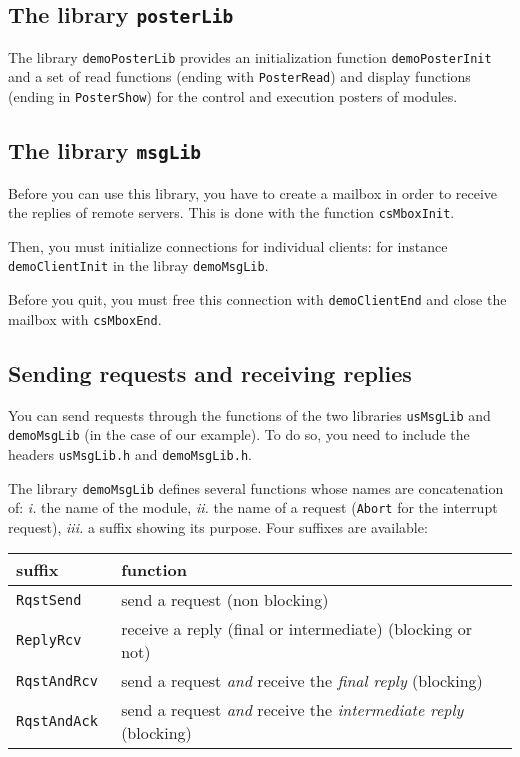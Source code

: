 \subsection{The library \texttt{posterLib}}

The library \texttt{demoPosterLib} provides an initialization function 
\texttt{demoPosterInit} and a set of  read functions (ending with \texttt{PosterRead})
and display  functions (ending in \texttt{PosterShow}) for the  control and
execution posters of modules.

\subsection{The library \texttt{msgLib}}

Before you can use this library, you have to create a mailbox in order to
receive the replies  of remote servers. This is   done with the  function
\texttt{csMboxInit}.

Then, you  must  initialize   connections  for individual    clients: for
instance \texttt{demoClientInit} in the libray \texttt{demoMsgLib}.

Before you  quit, you must  free this connection with \texttt{demoClientEnd}
and close the mailbox with \texttt{csMboxEnd}.


\subsection{Sending requests and receiving replies}
\label{sec|sending_request}

You   can send requests  through the  functions  of the two
libraries  \texttt{usMsgLib}   and \texttt{demoMsgLib}  (in  the case of   our
example). To do so, you need to include the  headers \texttt{usMsgLib.h} and
\texttt{demoMsgLib.h}.

The library \texttt{demoMsgLib}  defines  several functions whose  names are
concatenation of: \emph{i.} the name of the module, \emph{ii.} the name of
a request (\texttt{Abort} for the interrupt request),  \emph{iii.} a  suffix
showing its purpose. Four suffixes are available:


\begin{center}\small\begin{tabularx}{\linewidth}{|l|X|}
\hline
suffix & function \\
\hline
\tt RqstSend & send a request (non blocking) \\

\tt ReplyRcv & receive a reply (final or intermediate)  (blocking or not)\\

\tt RqstAndRcv & send a request \emph{and} receive the \emph{final reply}
(blocking) \\

\tt RqstAndAck & send a request \emph{and} receive the \emph{intermediate reply}
(blocking) \\
\hline
\end{tabularx}\end{center}

